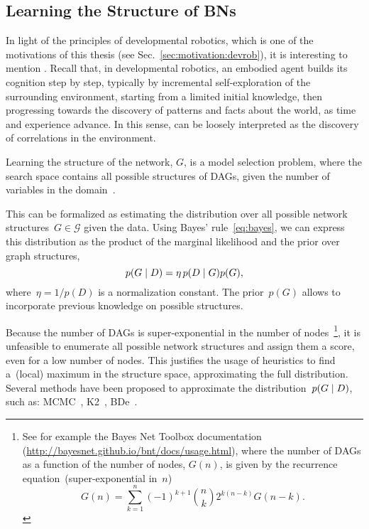 \subsection{Learning the Structure of \aclp{BN}}
\label{sec:background:theory:structure_learning}

In light of the principles of developmental robotics, which is one of the motivations of this thesis (see Sec.~\ref{sec:motivation:devrob}), it is interesting to mention \StructureLearning.
Recall that, in developmental robotics, an embodied agent builds its cognition step by step, typically by incremental self-exploration of the surrounding environment, starting from a limited initial knowledge, then progressing towards the discovery of patterns and facts about the world, as time and experience advance.
In this sense, \StructureLearning{} can be loosely interpreted as the discovery of correlations in the environment.

Learning the structure of the network, $G$, is a model selection problem, where the search space contains all possible structures of \acp{DAG}, given the number of variables in the domain~\cite{pearl:1988:probabilistic}.

This can be formalized as estimating the distribution over all possible network structures~$G \in \mathcal{G}$ given the data.
Using Bayes' rule~\eqref{eq:bayes}, we can express this distribution as the product of the marginal likelihood and the prior over graph structures,
\begin{equation}
    p(G \mid D) = \eta \, p(D \mid G) p(G),
\end{equation}
where~$\eta = 1/p(D)$ is a normalization constant.
The prior~$p(G)$ allows to incorporate previous knowledge on possible structures.

Because the number of \acp{DAG} is super-exponential in the number of nodes~\cite{robinson:1977:dag}\footnote{%
See for example the Bayes Net Toolbox documentation (\url{http://bayesnet.github.io/bnt/docs/usage.html}), where the number of \acp{DAG} as a function of the number of nodes, $G(n)$, is given by the recurrence equation~(super-exponential in~$n$)
\begin{equation*}
G(n) = \sum_{k=1}^n (-1)^{k+1} \binom{n}{k} 2^{k(n-k)} G(n-k).
\end{equation*}%
}, it is unfeasible to enumerate all possible network structures and assign them a score, even for a low number of nodes.
This justifies the usage of heuristics to find a~(local) maximum in the structure space, approximating the full distribution.
Several methods have been proposed to approximate the distribution~$p(G \mid D)$, such as:
\ac{MCMC}~\cite{madigan:1995:mcmc},
K2~\cite{cooper:1992:k2,bielza:2011:k2},
\ac{BDe}~\cite{shah:2009:pebl}.

